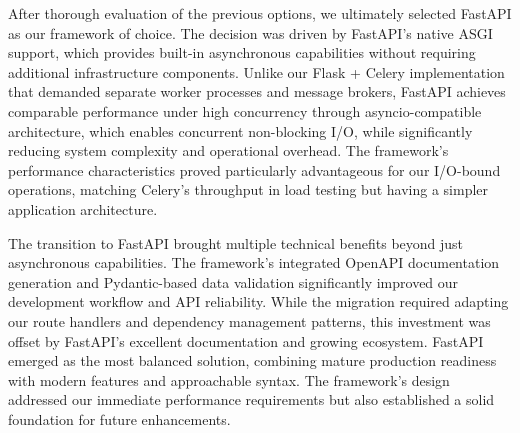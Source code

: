         After thorough evaluation of the previous options, we ultimately selected FastAPI as our framework of choice. 
        The decision was driven by FastAPI's native \ac{ASGI} support, which provides built-in asynchronous capabilities 
        without requiring additional infrastructure components. Unlike our Flask + Celery implementation that demanded 
        separate worker processes and message brokers, FastAPI achieves comparable performance under high concurrency through 
        asyncio-compatible architecture, which enables concurrent non-blocking I/O, while significantly reducing system 
        complexity and operational overhead. The framework's performance characteristics proved particularly advantageous 
        for our I/O-bound operations, matching Celery's throughput in load testing but having a simpler application 
        architecture.

        The transition to FastAPI brought multiple technical benefits beyond just asynchronous capabilities. The framework's 
        integrated OpenAPI documentation generation and Pydantic-based data validation significantly improved our development 
        workflow and API reliability. While the migration required adapting our route handlers and dependency management 
        patterns, this investment was offset by FastAPI's excellent documentation and growing ecosystem. FastAPI emerged as 
        the most balanced solution, combining mature production readiness with modern features and approachable syntax. 
        The framework's design addressed our immediate performance requirements but also established a solid foundation for 
        future enhancements.